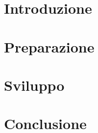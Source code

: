 \documentclass{report}
\begin{document}
    \tableofcontents
    \newpage

    \chapter{Introduzione}
    \blindtext

    \chapter{Preparazione}
    \blindtext

    \chapter{Sviluppo}
    \blindtext

    \chapter{Conclusione}
    \blindtext
\end{document}
